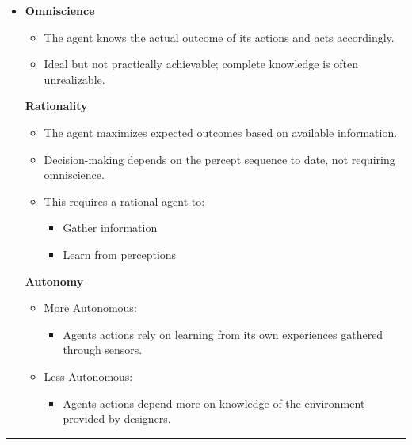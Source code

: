 \documentclass[
]{article}
\begin{document}
\begin{itemize}
\item
  \textbf{Omniscience}

  \begin{itemize}
  \item
    The agent knows the actual outcome of its actions and acts
    accordingly.
  \item
    Ideal but not practically achievable; complete knowledge is often
    unrealizable.
  \end{itemize}

  \textbf{Rationality}

  \begin{itemize}
  \item
    The agent maximizes expected outcomes based on available
    information.
  \item
    Decision-making depends on the percept sequence to date, not
    requiring omniscience.
  \item
    This requires a rational agent to:

    \begin{itemize}
    \item
      Gather information
    \item
      Learn from perceptions
    \end{itemize}
  \end{itemize}

  \textbf{Autonomy}

  \begin{itemize}
  \item
    More Autonomous:

    \begin{itemize}
    \item
      Agent\textquotesingle s actions rely on learning from its own
      experiences gathered through sensors.
    \end{itemize}
  \item
    Less Autonomous:

    \begin{itemize}
    \item
      Agent\textquotesingle s actions depend more on knowledge of the
      environment provided by designers.
    \end{itemize}
  \end{itemize}
\end{itemize}

\begin{center}\rule{0.5\linewidth}{0.5pt}\end{center}
\end{document}
